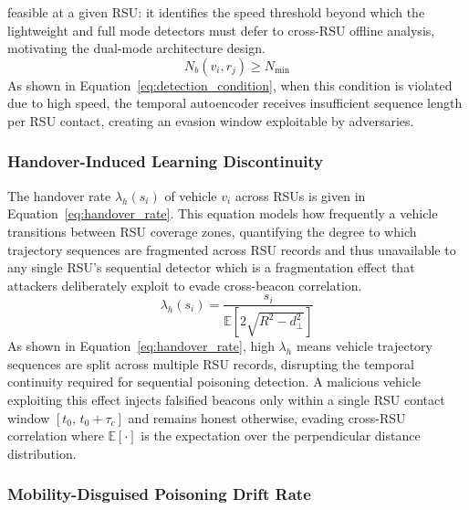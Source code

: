 \documentclass[12pt, a4paper]{report}
\begin{document}
feasible at a given RSU: it identifies the speed threshold beyond which
the lightweight and full mode detectors must defer to cross-RSU
offline analysis, motivating the dual-mode architecture design.
\newline
\newline
\begin{equation}
  N_b(v_i, r_j) \geq N_{\min}
  \label{eq:detection_condition}
\end{equation}
As shown in Equation~\ref{eq:detection_condition}, when this condition is
violated due to high speed, the temporal autoencoder receives insufficient
sequence length per RSU contact, creating an evasion window exploitable
by adversaries.

\subsubsection{Handover-Induced Learning Discontinuity}

The handover rate $\lambda_h(s_i)$ of vehicle $v_i$
across RSUs is given in Equation~\ref{eq:handover_rate}. This equation models how frequently a vehicle transitions between RSU
coverage zones, quantifying the degree to which trajectory sequences
are fragmented across RSU records and thus unavailable to any single
RSU's sequential detector which is a fragmentation effect that attackers
deliberately exploit to evade cross-beacon correlation.
\begin{equation}
  \lambda_h(s_i) = \frac{s_i}{\mathbb{E}[2\sqrt{R^2 - d_{\perp}^2}]}
  \label{eq:handover_rate}
\end{equation}
As shown in Equation~\ref{eq:handover_rate}, high $\lambda_h$
means vehicle trajectory sequences are split across multiple RSU records,
disrupting the temporal continuity required for sequential poisoning detection.
A malicious vehicle exploiting this effect injects falsified beacons only
within a single RSU contact window $[t_0,\, t_0 + \tau_c]$ and remains honest
otherwise, evading cross-RSU correlation where $\mathbb{E}[\cdot]$ is the expectation over the perpendicular distance
distribution.

\subsubsection{Mobility-Disguised Poisoning Drift Rate}
\end{document}
